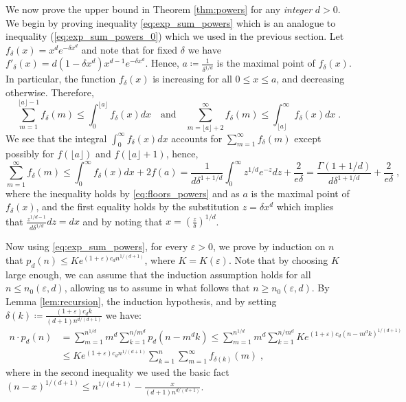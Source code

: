 \documentclass[11pt]{article}
\theoremstyle{plain}
\begin{document}
We now prove the upper bound in Theorem \ref{thm:powers} for any \emph{integer} $d>0$.
We begin by proving inequality \eqref{eq:exp_sum_powers} which is an analogue to inequality (\ref{eq:exp_sum_powers_0}) which we used in the previous section. Let $f_\delta(x)=x^{d}e^{-\delta x^{d}}$ and note that for fixed $\delta$ we have $f'_\delta(x)=d(1-\delta x^d)x^{d-1}e^{-\delta x^d}$. Hence, $a\coloneqq \frac{1}{\delta^{1/d}}$ is the maximal point of $f_\delta(x)$. In particular, the function $f_\delta(x)$ is increasing for all $0\leq x\leq a$, and decreasing otherwise.
Therefore,
\begin{equation}\label{eq:floors_powers}
     \sum_{m=1}^{\lfloor a\rfloor-1} f_\delta(m) \leq \int_{0}^{\lfloor a\rfloor}f_\delta(x) dx \quad\text{and}\quad \sum_{m=\lfloor a \rfloor+2}^{\infty} f_\delta(m) \leq \int_{\lfloor a\rfloor}^{\infty}f_\delta(x) dx\;.
\end{equation}
We see that the integral $\int_{0}^{\infty}f_\delta(x)dx$ accounts for $\sum_{m=1}^{\infty}f_\delta(m)$ except possibly for $f(\lfloor a\rfloor)$ and $f(\lfloor a\rfloor +1)$, hence,
\begin{equation}\label{eq:exp_sum_powers}
    \sum_{m=1}^{\infty}f_\delta(m)\leq \int_{0}^{\infty}f_\delta(x)dx+2f(a)=\frac{1}{d\delta^{1+{1}/{d}}}\int_{0}^{\infty}z^{1/d}e^{-z} dz+\frac{2}{e\delta}=\frac{\Gamma\left(1+{1}/{d}\right)}{d\delta^{1+1/d}}+\frac{2}{e\delta}\;,
\end{equation}
where the inequality holds by \eqref{eq:floors_powers} and as $a$ is the maximal point of $f_\delta(x)$, and the first equality holds by the substitution $z=\delta x^d$ which implies that $\frac{z^{1/d-1}}{d\delta^{1/d}}dz=dx$ and by noting that $x=\left(\frac{z}{\delta}\right)^{1/d}$.


Now using \eqref{eq:exp_sum_powers}, for every $\varepsilon>0$, we prove by induction on $n$ that $p_d(n) \leq K e^{(1+\varepsilon)c_dn^{1/(d+1)}}$, where $K=K(\varepsilon)$. Note that by choosing $K$ large enough, we can assume that the induction assumption holds for all $n \leq n_0(\varepsilon,d)$, allowing us to assume in what follows that $n \geq n_0(\varepsilon,d)$.
By Lemma \ref{lem:recursion}, the induction hypothesis, and by setting $\delta(k)\coloneqq \frac{(1+\varepsilon)c_d k}{(d+1)n^{d/(d+1)}}$ we have:
\begin{align}\label{eq:1.0}
    n\cdot p_{d}(n)&= \sum_{m=1}^{n^{1/d}} m^{d}\sum _{k=1}^{n/m^d} p_{d}(n-m^dk) \leq \sum_{m=1}^{n^{1/d}}m^d \sum _{k=1}^{n/m^{d}} K e^{(1+\varepsilon)c_d(n-m^dk)^{1/(d+1)}}\nonumber\\
    &\leq Ke^{(1+\varepsilon)c_d n^{1/(d+1)}}\sum _{k=1}^{n} \sum_{m=1}^{\infty}f_{\delta(k)}(m)\;,
\end{align}
where in the second inequality we used the basic fact $(n-x)^{1/(d+1)} \leq n^{1/(d+1)}-\frac{x}{(d+1)n^{d/(d+1)}}$.
\end{document}
